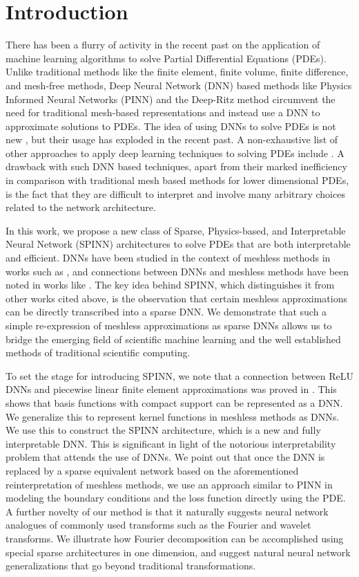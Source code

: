 \documentclass[12pt]{article}
\begin{document}
\section{Introduction}
There has been a flurry of activity in the recent past on the application of machine learning algorithms to solve Partial Differential Equations (PDEs). Unlike traditional methods like the finite element, finite volume, finite difference, and mesh-free methods, Deep Neural Network (DNN) based methods like Physics Informed Neural Networks (PINN) \cite{RPK2019} and the Deep-Ritz method \cite{EYu2018} circumvent the need for traditional mesh-based representations and instead use a DNN to approximate solutions to PDEs. The idea of using DNNs to solve PDEs is not new \cite{LLF97, LLP2000}, but their usage has exploded in the recent past. A non-exhaustive list of other approaches to apply deep learning techniques to solving PDEs include \cite{BN2018, SiKo2018, HJE2018, LLMXD2018, SAGNGHZR2020, WZ2020, LCX2020, CCLL2020, WXZZ2020pre, DS2020, lu2021deepxde, LTPGC2021}. A drawback with such DNN based techniques, apart from their marked inefficiency in comparison with traditional mesh based methods for lower dimensional PDEs, is the fact that they are difficult to interpret and involve many arbitrary choices related to the network architecture.

In this work, we propose a new class of Sparse, Physics-based, and Interpretable Neural Network (SPINN) architectures to solve PDEs that are both interpretable and efficient. DNNs have been studied in the context of meshless methods in works such as \cite{HHM2020, WZ2020}, and connections between DNNs and meshless methods have been noted in works like \cite{EMW20, CGPPT20}. The key idea behind SPINN, which distinguishes it from other works cited above, is the observation that certain meshless approximations can be directly transcribed into a sparse DNN. We demonstrate that such a simple re-expression of meshless approximations as sparse DNNs allows us to bridge the emerging field of scientific machine learning and the well established methods of traditional scientific computing.

To set the stage for introducing SPINN, we note that a connection between ReLU DNNs and piecewise linear finite element approximations was proved in \cite{HLXZ2020}. This shows that basis functions with compact support can be represented as a DNN. We generalize this to represent kernel functions in meshless methods as DNNs. We use this to construct the SPINN architecture, which is a new and fully interpretable DNN. This is significant in light of the notorious interpretability problem that attends the use of DNNs. We point out that once the DNN is replaced by a sparse equivalent network based on the aforementioned reinterpretation of meshless methods, we use an approach similar to PINN in modeling the boundary conditions and the loss function directly using the PDE. A further novelty of our method is that it naturally suggests neural network analogues of commonly used transforms such as the Fourier and wavelet transforms. We illustrate how Fourier decomposition can be accomplished using special sparse architectures in one dimension, and suggest natural neural network generalizations that go beyond traditional transformations.
\end{document}
